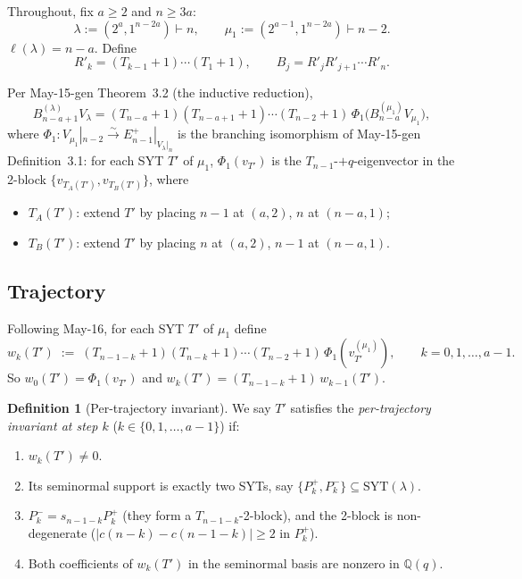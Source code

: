 \documentclass[11pt]{article}
\theoremstyle{definition}
\newtheorem{definition}[theorem]{Definition}
\begin{document}
Throughout, fix $a\ge 2$ and $n\ge 3a$:
\[
   \lambda:=(2^a,1^{n-2a})\vdash n,\qquad
   \mu_1:=(2^{a-1},1^{n-2a})\vdash n-2.
\]
$\ell(\lambda)=n-a$.  Define
\[
   R'_k=(T_{k-1}{+}1)\cdots(T_1{+}1),\qquad
   B_j=R'_jR'_{j+1}\cdots R'_n.
\]

Per May-15-gen Theorem~3.2 (the inductive reduction),
\begin{equation}\label{eq:gen-reduction}
   B_{n-a+1}^{(\lambda)}V_\lambda
   = (T_{n-a}{+}1)(T_{n-a+1}{+}1)\cdots(T_{n-2}{+}1)\,
   \Phi_1\big(B_{n-a}^{(\mu_1)}V_{\mu_1}\big),
\end{equation}
where $\Phi_1:V_{\mu_1}|_{n-2}\xrightarrow{\sim}E_{n-1}^+|_{V_\lambda|_n}$
is the branching isomorphism of May-15-gen Definition~3.1:
for each SYT $T'$ of $\mu_1$, $\Phi_1(v_{T'})$ is the
$T_{n-1}$-$+q$-eigenvector in the 2-block
$\{v_{T_A(T')},v_{T_B(T')}\}$, where
\begin{itemize}[leftmargin=2em,topsep=0.3em,itemsep=0.2em]
\item $T_A(T')$: extend $T'$ by placing $n-1$ at $(a,2)$, $n$ at
$(n-a,1)$;
\item $T_B(T')$: extend $T'$ by placing $n$ at $(a,2)$, $n-1$ at
$(n-a,1)$.
\end{itemize}

\subsection{Trajectory}

Following May-16, for each SYT $T'$ of $\mu_1$ define
\[
   w_k(T')\;:=\;(T_{n-1-k}{+}1)(T_{n-k}{+}1)\cdots(T_{n-2}{+}1)\,
   \Phi_1(v_{T'}^{(\mu_1)}),\qquad k=0,1,\ldots,a-1.
\]
So $w_0(T')=\Phi_1(v_{T'})$ and $w_k(T')=(T_{n-1-k}{+}1)\,w_{k-1}(T')$.

\begin{definition}[Per-trajectory invariant]\label{def:invariant}
We say $T'$ satisfies the \emph{per-trajectory invariant at step $k$}
($k\in\{0,1,\ldots,a-1\}$) if:
\begin{enumerate}[leftmargin=2em,topsep=0.3em,itemsep=0.2em,label=(P\arabic*)]
\item $w_k(T')\ne 0$.
\item Its seminormal support is exactly two SYTs, say
$\{P_k^+,P_k^-\}\subseteq\mathrm{SYT}(\lambda)$.
\item $P_k^-=s_{n-1-k}P_k^+$ (they form a $T_{n-1-k}$-2-block),
and the 2-block is non-degenerate ($|c(n-k)-c(n-1-k)|\ge 2$ in $P_k^+$).
\item Both coefficients of $w_k(T')$ in the seminormal basis are
nonzero in $\mathbb{Q}(q)$.
\end{enumerate}
\end{definition}
\end{document}

